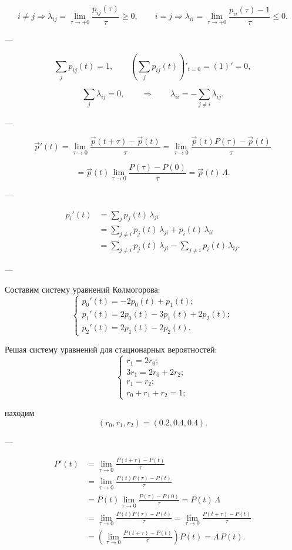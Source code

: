 \[
	i \ne j \Rightarrow
	\lambda_{ij} = \lim_{\tau \to +0}
	\frac{p_{ij}(\tau)}{\tau} \ge 0,
	\qquad
	i = j \Rightarrow
	\lambda_{ii} = \lim_{\tau \to +0}
	\frac{p_{ii}(\tau) - 1}{\tau} \le 0.
\]

---


\[
	\sum_j p_{ij}(t) = 1,
	\qquad
	\left( \sum_j p_{ij}(t) \right)'_{t=0} = (1)' = 0,
\]

\[
	\sum_j \lambda_{ij} = 0,
	\qquad
	\Rightarrow
	\qquad
	\lambda_{ii} = - \sum_{j \ne i} \lambda_{ij}.
\]


---

\[
	\vec{p}'(t)
	= \lim_{\tau \to 0}
	\frac{\vec{p}(t+\tau) - \vec{p}(t)}{\tau}
	=
	\lim_{\tau \to 0}
	\frac{\vec{p}(t){P}(\tau) - \vec{p}(t)}{\tau}
\]

\[
	= \vec{p}(t)
	\lim_{\tau \to 0}
	\frac{P(\tau) - P(0)}{\tau}
	= \vec{p}(t)\,{\Lambda}.
\]

---

\begin{align*}
	p_i'(t)
	 & = \sum_j p_j(t)\,\lambda_{ji}
	\\[4pt]
	 & = \sum_{j \ne i} p_j(t)\,\lambda_{ji} + p_i(t)\,\lambda_{ii}
	\\[4pt]
	 & = \sum_{j \ne i} p_j(t)\,\lambda_{ji} - \sum_{j \ne i} p_i(t)\,\lambda_{ij}.
\end{align*}

---

Составим систему уравнений Колмогорова:
\[
	\begin{cases}
		p_0'(t) = -2p_0(t) + p_1(t);           \\
		p_1'(t) = 2p_0(t) - 3p_1(t) + 2p_2(t); \\
		p_2'(t) = 2p_1(t) - 2p_2(t).
	\end{cases}
\]

Решая систему уравнений для стационарных вероятностей:
\[
	\begin{cases}
		r_1 = 2r_0;         \\
		3r_1 = 2r_0 + 2r_2; \\
		r_1 = r_2;          \\
		r_0 + r_1 + r_2 = 1;
	\end{cases}
\]

находим
\[
	(r_0, r_1, r_2) = (0.2, 0.4, 0.4).
\]

---

\begin{align*}
	{P}'(t)
	 & = \lim_{\tau \to 0}
	\frac{{P}(t+\tau) - {P}(t)}{\tau}
	\\[4pt]
	 & = \lim_{\tau \to 0}
	\frac{{P}(t){P}(\tau) - {P}(t)}{\tau}
	\\[4pt]
	 & = {P}(t)
	\lim_{\tau \to 0}
	\frac{{P}(\tau) - {P}(0)}{\tau}
		= {P}(t)\,{\Lambda}
	\\[4pt]
	 & = \lim_{\tau \to 0}
	\frac{{P}(t){P}(\tau) - {P}(t)}{\tau}
	= \lim_{\tau \to 0}
	\frac{{P}(t+\tau) - {P}(t)}{\tau}
	\\[4pt]
	 & =
	\left(
	\lim_{\tau \to 0}
	\frac{{P}(t+\tau) - {P}(t)}{\tau}
	\right)
	{P}(t)
	= {\Lambda}\,{P}(t).
\end{align*}

